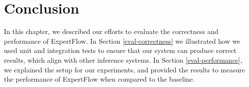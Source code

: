 \section{Conclusion}
In this chapter, we described our efforts to evaluate the correctness and performance of ExpertFlow. In Section \ref{eval-correctness} we illustrated how we used unit and integration tests to ensure that our system can produce correct results, which align with other inference systems. In Section \ref{eval-performance}, we explained the setup for our experiments, and provided the results to measure the performance of ExpertFlow when compared to the baseline.